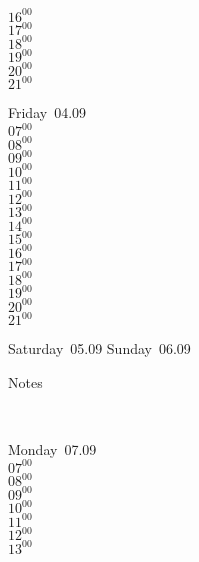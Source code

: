 \documentclass[11pt,a4paper]{book}\usepackage[]{graphicx}\usepackage[]{color}
\begin{document}
{{{{{{{{{\begin{tcolorbox}
{$16^{00}$\\
$17^{00}$\\
$18^{00}$\\
$19^{00}$\\
$20^{00}$\\
$21^{00}$}\\
\end{tcolorbox} 
%
\begin{tcolorbox}
Friday~04.09\\
{ 
$07^{00}$\\
$08^{00}$\\
$09^{00}$\\
$10^{00}$\\
$11^{00}$\\
$12^{00}$\\
$13^{00}$\\
$14^{00}$\\
$15^{00}$\\
$16^{00}$\\
$17^{00}$\\
$18^{00}$\\
$19^{00}$\\
$20^{00}$\\
$21^{00}$}\\
\end{tcolorbox} 
%
\begin{tcolorbox}[height=(\textheight-10mm)/6]
Saturday~05.09
\tcblower
Sunday~06.09
\end{tcolorbox} %
%
\begin{tcolorbox}[height=(\textheight-10mm)/6,sidebyside=false]
Notes
\end{tcolorbox}
\clearpage
\vspace{2 mm}\\
%
%
\begin{tcolorbox}
Monday~07.09\\
{ 
$07^{00}$\\
$08^{00}$\\
$09^{00}$\\
$10^{00}$\\
$11^{00}$\\
$12^{00}$\\
$13^{00}$\\
}
\end{tcolorbox}}}}}}}}}}
\end{document}

